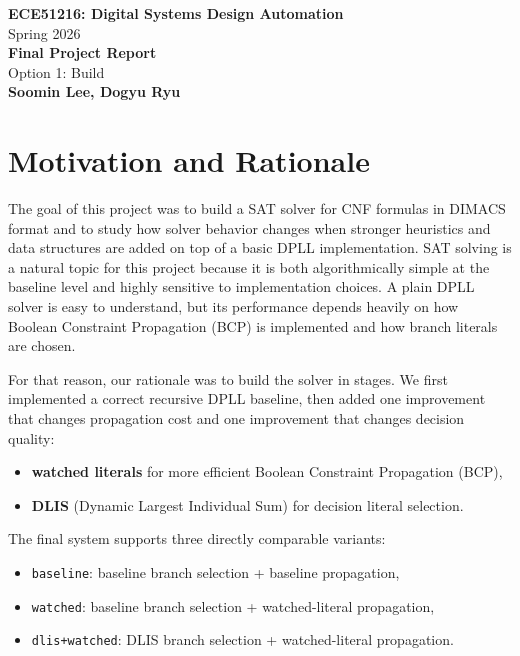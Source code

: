 \documentclass[11pt]{article}
\begin{document}
\begin{center}
    {\Large \textbf{ECE51216: Digital Systems Design Automation}}\\
    {\normalsize Spring 2026}\\[0.4em]
    {\Large \textbf{Final Project Report}}\\[0.3em]
    {\normalsize Option 1: Build}\\[0.6em]
    \textbf{Soomin Lee, Dogyu Ryu}
\end{center}

\section{Motivation and Rationale}

The goal of this project was to build a SAT solver for CNF formulas in DIMACS
format and to study how solver behavior changes when stronger heuristics and
data structures are added on top of a basic DPLL implementation. SAT solving is
a natural topic for this project because it is both algorithmically simple at
the baseline level and highly sensitive to implementation choices. A plain DPLL
solver is easy to understand, but its performance depends heavily on how Boolean
Constraint Propagation (BCP) is implemented and how branch literals are chosen.

For that reason, our rationale was to build the solver in stages. We first
implemented a correct recursive DPLL baseline, then added one improvement that
changes propagation cost and one improvement that changes decision quality:

\begin{itemize}
    \item \textbf{watched literals} for more efficient Boolean Constraint
    Propagation (BCP),
    \item \textbf{DLIS} (Dynamic Largest Individual Sum) for decision literal
    selection.
\end{itemize}

The final system supports three directly comparable variants:

\begin{itemize}
    \item \texttt{baseline}: baseline branch selection + baseline propagation,
    \item \texttt{watched}: baseline branch selection + watched-literal
    propagation,
    \item \texttt{dlis+watched}: DLIS branch selection + watched-literal
    propagation.
\end{itemize}
\end{document}
